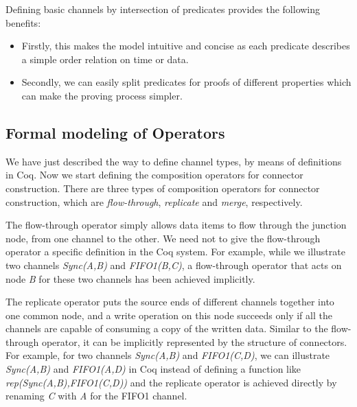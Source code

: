 \documentclass{llncs}
\begin{document}
Defining basic channels by intersection of predicates provides the following benefits:
\begin{itemize}
\item Firstly, this makes the model intuitive and concise as each predicate describes a simple order relation on time or data.
\item Secondly, we can easily split predicates for proofs of different properties which can make the proving process simpler.
\end{itemize}

\subsection{Formal modeling of Operators}
We have just described the way to define channel types, by means of definitions in Coq. Now we start defining the composition operators for connector construction. There are three types of composition operators for connector construction, which are \emph{flow-through}, \emph{replicate} and \emph{merge}, respectively.

The flow-through operator simply allows data items to flow through the junction node, from one channel to the other. We need not to give the flow-through operator a specific definition in the Coq system. For example, while we illustrate two channels \emph{Sync(A,B)} and \emph{FIFO1(B,C)}, a flow-through operator that acts on node \emph{B} for these two channels has been achieved implicitly.

The replicate operator puts the source ends of different channels together into one common node, and a write operation on this node succeeds only if all the channels are capable of consuming a copy of the written data. %
Similar to the flow-through operator, it can be implicitly represented by the structure of connectors. For example, for two channels \emph{Sync(A,B)} and \emph{FIFO1(C,D)}, we can illustrate \emph{Sync(A,B)} and \emph{FIFO1(A,D)} in Coq instead of defining a function like \emph{rep(Sync(A,B),FIFO1(C,D))} and the replicate operator is achieved directly by renaming \emph{C} with \emph{A} for the FIFO1 channel.
\end{document}
